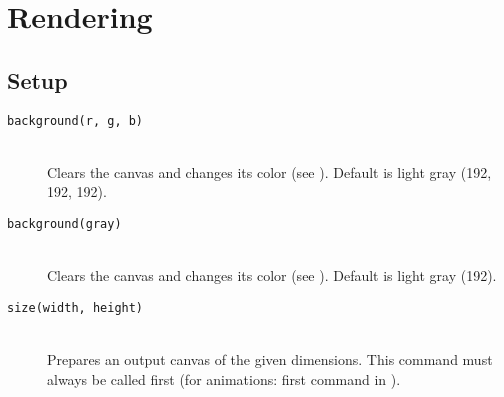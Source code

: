 \section{Rendering}

\subsection{Setup}
\begin{description}
\item[\texttt{background(r, g, b)}] \hfill \\
	Clears the canvas and changes its color (see ). Default is light gray (192, 192, 192).
\item[\texttt{background(gray)}] \hfill \\
	Clears the canvas and changes its color (see ). Default is light gray (192).
\item[\texttt{size(width, height)}] \hfill \\
	Prepares an output canvas of the given dimensions. This command must always be called first (for animations: first command in ).
\end{description}

